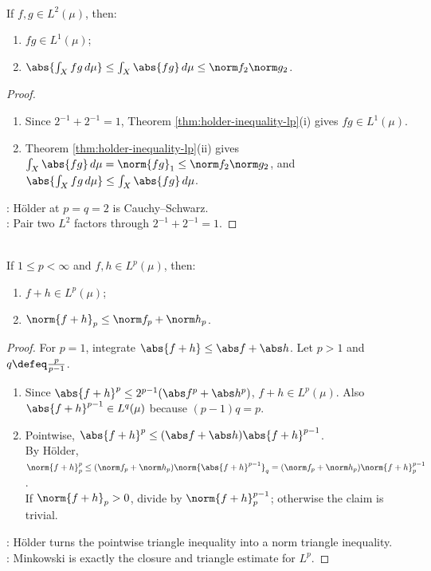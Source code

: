 \begin{corollary} \label{cor:cauchy-schwarz-l2-integral} \\
If $f,g\in L^2(\mu)$, then:
\begin{enumerate}[label=(\roman*)]
\setlength{\itemsep}{0pt}
\item $fg\in L^1(\mu)$;
\item $\abs{\int_Xfg\,d\mu}\leq\int_X\abs{fg}\,d\mu\leq\norm f_2\norm g_2$.
\end{enumerate}
\begin{proof}
\begin{enumerate}[label=(\roman*)]
\setlength{\itemsep}{0pt}
\item Since $2^{-1}+2^{-1}=1$, Theorem \ref{thm:holder-inequality-lp}(i) gives $fg\in L^1(\mu)$.
\item Theorem \ref{thm:holder-inequality-lp}(ii) gives $\int_X\abs{fg}\,d\mu=\norm{fg}_1\leq\norm f_2\norm g_2$, and $\abs{\int_Xfg\,d\mu}\leq\int_X\abs{fg}\,d\mu$.
\end{enumerate}
: H\"older at $p=q=2$ is Cauchy--Schwarz.\\
: Pair two $L^2$ factors through $2^{-1}+2^{-1}=1$.
\end{proof}
\end{corollary}

\begin{theorem} \label{thm:minkowski-inequality-lp} \\
If $1\leq p<\infty$ and $f,h\in L^p(\mu)$, then:
\begin{enumerate}[label=(\roman*)]
\setlength{\itemsep}{0pt}
\item $f+h\in L^p(\mu)$;
\item $\norm{f+h}_p\leq\norm f_p+\norm h_p$.
\end{enumerate}
\begin{proof}
For $p=1$, integrate $\abs{f+h}\leq\abs f+\abs h$. Let $p>1$ and $q\defeq\frac{p}{p-1}$.
\begin{enumerate}[label=(\roman*)]
\setlength{\itemsep}{0pt}
\item Since $\abs{f+h}^p\leq2^{p-1}(\abs f^p+\abs h^p)$, $f+h\in L^p(\mu)$. Also $\abs{f+h}^{p-1}\in L^q(\mu)$ because $(p-1)q=p$.
\item Pointwise, $\abs{f+h}^p\leq(\abs f+\abs h)\abs{f+h}^{p-1}$.\\
By H\"older, $\norm{f+h}_p^p\leq(\norm f_p+\norm h_p)\norm{\abs{f+h}^{p-1}}_q=(\norm f_p+\norm h_p)\norm{f+h}_p^{p-1}$.\\
If $\norm{f+h}_p>0$, divide by $\norm{f+h}_p^{p-1}$; otherwise the claim is trivial.
\end{enumerate}
: H\"older turns the pointwise triangle inequality into a norm triangle inequality.\\
: Minkowski is exactly the closure and triangle estimate for $L^p$.
\end{proof}
\end{theorem}

